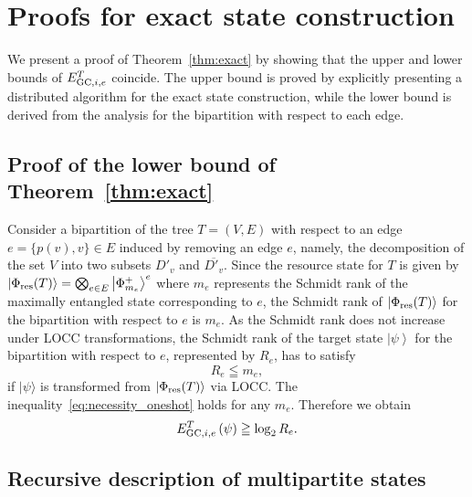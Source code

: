 \documentclass[preprintnumbers,aps,amsmath,amssymb,pra,twocolumn,showpacs,superscriptaddress,floatfix]{revtex4-1}
\def\Ket#1{\left|#1\right\rangle}
\newcommand{\ket}[1]{|{#1}\rangle}
\theoremstyle{plain}
\theoremstyle{definition}
\theoremstyle{remark}
\begin{document}
\appendix


\section{\label{app:a}Proofs for exact state construction}

We present a proof of Theorem~\ref{thm:exact} by showing that the upper and lower bounds of $E_{\textup{GC},i,e}^T$ coincide.
The upper bound is proved by explicitly presenting a distributed algorithm for the exact state construction, while the lower bound is derived from the analysis for the bipartition with respect to each edge.

\subsection{Proof of the lower bound of Theorem~\ref{thm:exact}} 
Consider a bipartition of the tree $T=(V,E)$ with respect to an edge $e=\{p(v),v\}\in E$ induced by removing an edge $e$, namely, the decomposition of the set $V$ into two subsets $D'_v$ and $\overline{D'_v}$.   Since the resource state for $T$ is given by $\Ket{\Phi_{\textup{res}}(T)}=\bigotimes_{e\in E}\Ket{\Phi_{m_e}^+}^e$ where $m_e$ represents the Schmidt rank of the maximally entangled state corresponding to $e$, the Schmidt rank of $\Ket{\Phi_{\textup{res}}(T)}$ for the bipartition with respect to $e$ is $m_e$.
As the Schmidt rank does not increase under LOCC transformations, the Schmidt rank of the target state $\Ket{\psi}$ for the bipartition with respect to $e$, represented by $R_e$, has to satisfy
\begin{equation}
    R_e \leqq m_e,
\label{eq:necessity_oneshot}
\end{equation}
if $\ket{\psi}$ is transformed from $\Ket{\Phi_{\textup{res}}(T)}$ via LOCC\@.  The inequality~\eqref{eq:necessity_oneshot} holds for any $m_{e}$.  Therefore we obtain
\begin{equation}
    \label{eq:exact_lower}
    E_{\textup{GC},i,e}^T\left(\psi\right)\geqq\log_2 R_e.
\end{equation}



\subsection{Recursive description of multipartite states}
\end{document}
